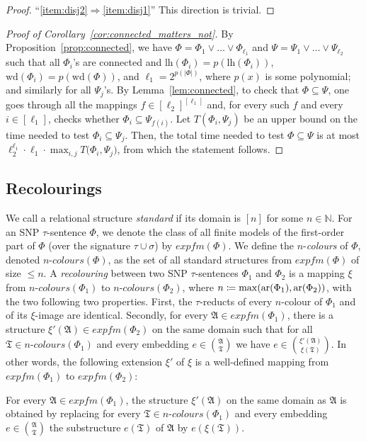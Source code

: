 \documentclass[oneside,reqno,12pt]{amsart}
\theoremstyle{plain}
\theoremstyle{remark}
\renewcommand{\coloneqq}{\mathrel{\mathop:}\mathrel{\mkern-1.2mu}=}
\newcommand{\struct}[1]{\mathfrak{#1}}
\newcommand{\efm}{\ensuremath{\mathit{expfm}}\xspace}
\newcommand{\colours}{\ensuremath{n\text{-}\mathit{colours}}}
\newcommand{\lh}{\ensuremath{\mathrm{lh}}\xspace}
\newcommand{\wh}{\ensuremath{\mathrm{wd}}\xspace}
\newcommand{\ar}{\ensuremath{\mathrm{ar}}\xspace}
\begin{document}
{\begin{proof}
``\eqref{item:disj2}$\Rightarrow$\eqref{item:disj1}'' This direction is trivial.
\end{proof}
 
\begin{proof}[Proof of Corollary~\ref{cor:connected_matters_not}]
    By Proposition~\ref{prop:connected}, we have $\Phi = \Phi_1\vee\dots\vee\Phi_{\ell_1}$ and $\Psi = \Psi_1\vee\dots\vee\Psi_{\ell_2}$ such that all $\Phi_i$'s are connected and $\lh(\Phi_i)=p(\lh(\Phi_i))$, $\wh(\Phi_i)=p(\wh(\Phi))$, and $\ell_1=2^{p(|\Phi|)}$, where $p(x)$ is some polynomial; and similarly for all $\Psi_j$'s.
By Lemma~\ref{lem:connected}, to check that $\Phi\subseteq \Psi$, one goes through all the mappings $f\in [\ell_2]^{[\ell_1]}$ and, for every such $f$ and every $i\in[\ell_1]$, checks whether $\Phi_i\subseteq\Psi_{f(i)}$.
Let $T(\Phi_i,\Psi_j)$ be an upper bound on the time needed to test $\Phi_i\subseteq \Psi_j$.
Then, the total time needed to test $\Phi\subseteq \Psi$ is at most $\ell_2^{\ell_1}\cdot \ell_1\cdot \max_{i,j} T\bigl(\Phi_i,\Psi_j\bigr)$, from which the statement follows.
\end{proof}




\subsection{Recolourings} \label{section:recolourings}

We call a relational structure \emph{standard} if its domain is $[n]$ for some $n\in \mathbb{N}$.
For an SNP $\tau$-sentence $\Phi$, we denote the class of all finite models of the first-order part of $\Phi$  (over the signature $\tau\cup \sigma$) by $\efm(\Phi)$.    
We define the $n$-\emph{colours} of $\Phi$, denoted $\colours(\Phi)$, as the set of all standard structures from $\efm(\Phi)$ of size $\leq n$.
A \emph{recolouring} between two SNP $\tau$-sentences $\Phi_1$ and $\Phi_2$ is a mapping $\xi$ from $\colours(\Phi_1)$ to $\colours(\Phi_2)$, where $n\coloneqq \max(\ar(\Phi_1),\ar(\Phi_2))$, with the two following two properties.
First, the $\tau$-reducts of every $n$-colour of $\Phi_1$ and of its $\xi$-image are identical.
Secondly, for every $\struct A\in \efm(\Phi_1)$, there is a structure $\xi'(\struct A)\in \efm(\Phi_2)$ on the same domain such that for all $\struct{T} \in \colours(\Phi_1)$ and every embedding $e\in \binom{\struct{A}}{\struct{T}}$ we have $e\in \binom{\xi'(\struct{A})}{\xi(\struct{T})}$. 
In other words, the following  extension $\xi'$ of $\xi$ is a well-defined mapping from $\efm(\Phi_1)$ to $\efm(\Phi_2)$: 
\begin{center} \vspace{0.75em}
    {\it \parbox{0.65\textwidth}{For every $\struct{A}\in \efm(\Phi_1)$, the structure $\xi'(\struct{A})$ on the same domain as $\struct{A}$ is obtained by replacing for every  $\struct{T} \in \colours(\Phi_1)$ and every embedding $e\in \binom{\struct{A}}{\struct{T}}$ the substructure $e(\struct{T})$ of $\struct A$ by $e(\xi(\struct{T}))$.}  
    } \vspace{0.75em}
\end{center} 

}
\end{document}

